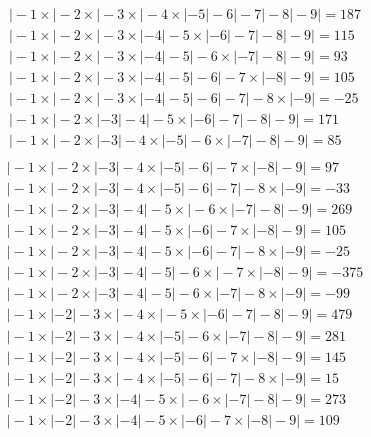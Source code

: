 \documentclass{article}
\begin{document}
\begin{center}

\begin{align*}
\Bigg|-1\times\bigg|-2\times\Big|-3\times\big|-4\times|-5|-6\big|-7\Big|-8\bigg|-9\Bigg|=187 \\
\bigg|-1\times\Big|-2\times\big|-3\times|-4|-5\times|-6|-7\big|-8\Big|-9\bigg|=115 \\
\bigg|-1\times\Big|-2\times\big|-3\times|-4|-5\big|-6\times|-7|-8\Big|-9\bigg|=93 \\
\bigg|-1\times\Big|-2\times\big|-3\times|-4|-5\big|-6\Big|-7\times|-8|-9\bigg|=105 \\
\bigg|-1\times\Big|-2\times\big|-3\times|-4|-5\big|-6\Big|-7\bigg|-8\times|-9|=-25 \\
\bigg|-1\times\Big|-2\times|-3|-4\big|-5\times|-6|-7\big|-8\Big|-9\bigg|=171 \\
\Big|-1\times\big|-2\times|-3|-4\times|-5|-6\times|-7|-8\big|-9\Big|=85 \\
\end{align*} %
\begin{align*}
\Big|-1\times\big|-2\times|-3|-4\times|-5|-6\big|-7\times|-8|-9\Big|=97 \\
\Big|-1\times\big|-2\times|-3|-4\times|-5|-6\big|-7\Big|-8\times|-9|=-33 \\
\Big|-1\times\big|-2\times|-3|-4\big|-5\times\big|-6\times|-7|-8\big|-9\Big|=269 \\
\Big|-1\times\big|-2\times|-3|-4\big|-5\times|-6|-7\times|-8|-9\Big|=105 \\
\Big|-1\times\big|-2\times|-3|-4\big|-5\times|-6|-7\Big|-8\times|-9|=-25 \\
\Big|-1\times\big|-2\times|-3|-4\big|-5\Big|-6\times\big|-7\times|-8|-9\big|=-375 \\
\Big|-1\times\big|-2\times|-3|-4\big|-5\Big|-6\times|-7|-8\times|-9|=-99 \\
\bigg|-1\times|-2|-3\times\Big|-4\times\big|-5\times|-6|-7\big|-8\Big|-9\bigg|=479 \\
\Big|-1\times|-2|-3\times\big|-4\times|-5|-6\times|-7|-8\big|-9\Big|=281 \\
\Big|-1\times|-2|-3\times\big|-4\times|-5|-6\big|-7\times|-8|-9\Big|=145 \\
\Big|-1\times|-2|-3\times\big|-4\times|-5|-6\big|-7\Big|-8\times|-9|=15 \\
\Big|-1\times|-2|-3\times|-4|-5\times\big|-6\times|-7|-8\big|-9\Big|=273 \\
\big|-1\times|-2|-3\times|-4|-5\times|-6|-7\times|-8|-9\big|=109 \\

\end{align*}
\end{center}
\end{document}
